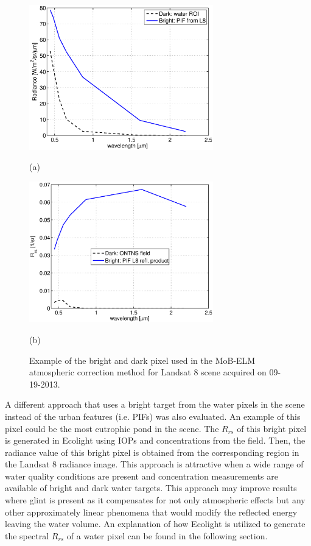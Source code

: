 \documentclass[onecolumn,3p,letterpaper,11pt]{elsarticle}
\begin{document}
\begin{figure}[htb]
  \begin{minipage}[c]{0.48\linewidth}
    \centering
      \includegraphics[width=8cm]{./Images/ELMrad130929_150422.eps}
    \centerline{(a)}\medskip
  \end{minipage}
  \hfill
  \begin{minipage}[d]{0.48\linewidth}
    \centering
      \includegraphics[width=8cm]{./Images/ELMRrs130929_150422.eps}
    \centerline{(b)}\medskip
  \end{minipage}
  \caption{Example of the bright and dark pixel used in the MoB-ELM atmospheric correction method for Landsat 8 scene acquired on 09-19-2013.\label{fig:MOBELMpxls} } 
\end{figure}

A different approach that uses a bright target from the water pixels in the scene instead of the urban features (i.e. PIFs) was also evaluated. An example of this pixel could be the most eutrophic pond in the scene. The $R_{rs}$ of this bright pixel is generated in Ecolight using IOPs and concentrations from the field. Then, the radiance value of this bright pixel is obtained from the corresponding region in the Landsat 8 radiance image. This approach is attractive when a wide range of water quality conditions are present and concentration measurements are available of bright and dark water targets. This approach may improve results where glint is present as it compensates for not only atmospheric effects but any other approximately linear phenomena that would modify the reflected energy leaving the water volume. An explanation of how Ecolight is utilized to generate the spectral $R_{rs}$ of a water pixel can be found in the following section.
\end{document}
